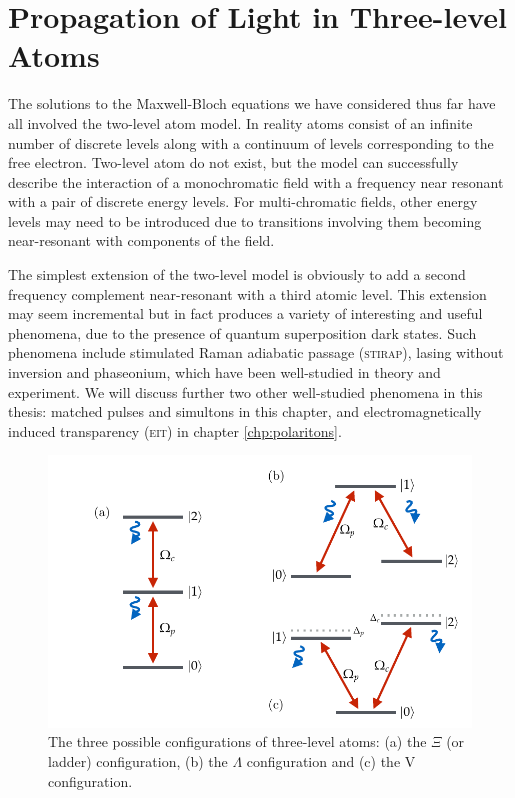 \section{Propagation of Light in Three-level Atoms}
  \label{sec:nonlinear_intro}

    The solutions to the Maxwell-Bloch equations we have considered thus far
    have all involved the two-level atom model. In reality atoms consist of an
    infinite number of discrete levels along with a continuum of levels
    corresponding to the free electron. Two-level atom do not exist, but the
    model can successfully describe the interaction of a monochromatic field
    with a frequency near resonant with a pair of discrete energy levels. For
    multi-chromatic fields, other energy levels may need to be introduced due to
    transitions involving them becoming near-resonant with components of the
    field.

    The simplest extension of the two-level model is obviously to add a second
    frequency complement near-resonant with a third atomic level. This extension
    may seem incremental but in fact produces a variety of interesting and
    useful phenomena, due to the presence of quantum superposition dark states.
    Such phenomena include stimulated Raman adiabatic passage
    (\textsc{stirap})\cite{Grigoryan2001,Unanyan1998}, lasing without
    inversion\cite{Blok1990,Imamoglu1989,Scully1989} and
    phaseonium\cite{Scully1991,Eberly1996}, which have been well-studied in
    theory and experiment. We will discuss further two other well-studied
    phenomena in this thesis: matched pulses and simultons in this chapter, and
    electromagnetically induced transparency (\textsc{eit}) in chapter
    \ref{chp:polaritons}.

    \begin{figure}[]
      \includegraphics[width=\linewidth]
        {figs/03_nonlinear/three_level_diagrams_2.pdf}
      \caption{
      The three possible configurations of three-level atoms: (a) the $\Xi$ (or ladder) configuration, (b) the $\Lambda$ configuration and (c) the V configuration.
      }
      \label{fig:three_level_diagrams}
    \end{figure}

